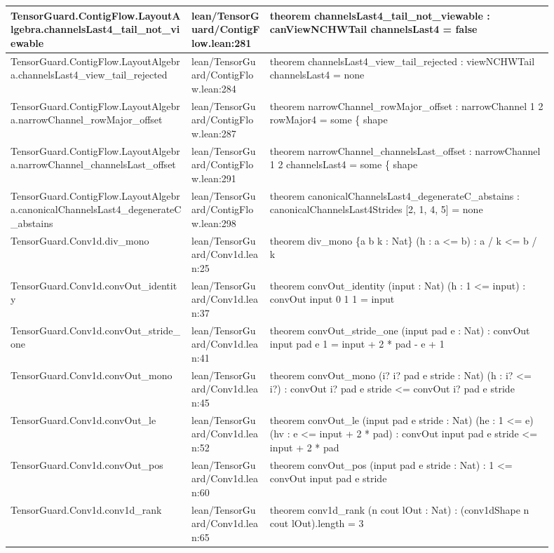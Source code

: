\documentclass[10pt]{article}
\begin{document}
\begin{longtable}{|p{0.30\linewidth}|p{0.13\linewidth}|p{0.47\linewidth}|}
\hline
TensorGuard.ContigFlow.LayoutAlgebra.channelsLast4\_tail\_not\_viewable & lean/TensorGuard/ContigFlow.lean:281 & theorem channelsLast4\_tail\_not\_viewable : canViewNCHWTail channelsLast4 = false \\
\hline
TensorGuard.ContigFlow.LayoutAlgebra.channelsLast4\_view\_tail\_rejected & lean/TensorGuard/ContigFlow.lean:284 & theorem channelsLast4\_view\_tail\_rejected : viewNCHWTail channelsLast4 = none \\
\hline
TensorGuard.ContigFlow.LayoutAlgebra.narrowChannel\_rowMajor\_offset & lean/TensorGuard/ContigFlow.lean:287 & theorem narrowChannel\_rowMajor\_offset : narrowChannel 1 2 rowMajor4 = some \{ shape \\
\hline
TensorGuard.ContigFlow.LayoutAlgebra.narrowChannel\_channelsLast\_offset & lean/TensorGuard/ContigFlow.lean:291 & theorem narrowChannel\_channelsLast\_offset : narrowChannel 1 2 channelsLast4 = some \{ shape \\
\hline
TensorGuard.ContigFlow.LayoutAlgebra.canonicalChannelsLast4\_degenerateC\_abstains & lean/TensorGuard/ContigFlow.lean:298 & theorem canonicalChannelsLast4\_degenerateC\_abstains : canonicalChannelsLast4Strides [2, 1, 4, 5] = none \\
\hline
TensorGuard.Conv1d.div\_mono & lean/TensorGuard/Conv1d.lean:25 & theorem div\_mono \{a b k : Nat\} (h : a <= b) : a / k <= b / k \\
\hline
TensorGuard.Conv1d.convOut\_identity & lean/TensorGuard/Conv1d.lean:37 & theorem convOut\_identity (input : Nat) (h : 1 <= input) : convOut input 0 1 1 = input \\
\hline
TensorGuard.Conv1d.convOut\_stride\_one & lean/TensorGuard/Conv1d.lean:41 & theorem convOut\_stride\_one (input pad e : Nat) : convOut input pad e 1 = input + 2 * pad - e + 1 \\
\hline
TensorGuard.Conv1d.convOut\_mono & lean/TensorGuard/Conv1d.lean:45 & theorem convOut\_mono (i? i? pad e stride : Nat) (h : i? <= i?) : convOut i? pad e stride <= convOut i? pad e stride \\
\hline
TensorGuard.Conv1d.convOut\_le & lean/TensorGuard/Conv1d.lean:52 & theorem convOut\_le (input pad e stride : Nat) (he : 1 <= e) (hv : e <= input + 2 * pad) : convOut input pad e stride <= input + 2 * pad \\
\hline
TensorGuard.Conv1d.convOut\_pos & lean/TensorGuard/Conv1d.lean:60 & theorem convOut\_pos (input pad e stride : Nat) : 1 <= convOut input pad e stride \\
\hline
TensorGuard.Conv1d.conv1d\_rank & lean/TensorGuard/Conv1d.lean:65 & theorem conv1d\_rank (n cout lOut : Nat) : (conv1dShape n cout lOut).length = 3 \\

\end{longtable}
\end{document}
